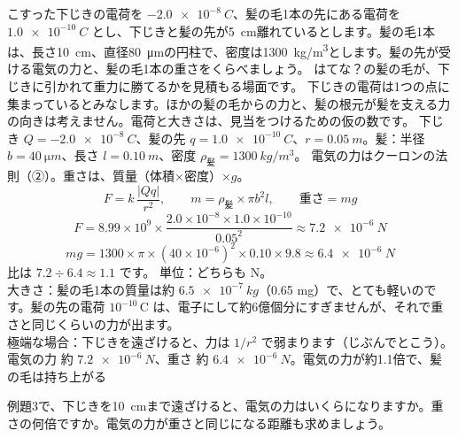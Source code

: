 \label{ph:電-1:ex3}
\begin{phreidai}
こすった下じきの電荷を $\qty{-2.0e-8}{C}$、髪の毛1本の先にある電荷を $\qty{+1.0e-10}{C}$ とし、下じきと髪の先が\qty{5}{cm}離れているとします。髪の毛1本は、長さ\qty{10}{cm}、直径\qty{80}{\micro m}の円柱で、密度は\qty{1300}{kg/m^3}とします。髪の先が受ける電気の力と、髪の毛1本の重さをくらべましょう。
\phbamen
はてな？の髪の毛が、下じきに引かれて重力に勝てるかを見積もる場面です。
\phmushi
下じきの電荷は1つの点に集まっているとみなします。ほかの髪の毛からの力と、髪の根元が髪を支える力の向きは考えません。電荷と大きさは、見当をつけるための仮の数です。
\phzu
下じき $Q=\qty{-2.0e-8}{C}$、髪の先 $q=\qty{1.0e-10}{C}$、$r=\qty{0.05}{m}$。髪：半径 $b=\qty{40}{\micro m}$、長さ $l=\qty{0.10}{m}$、密度 $\rho_{\text{髪}}=\qty{1300}{kg/m^3}$。
\phriyu
電気の力はクーロンの法則（②）。重さは、質量（体積×密度）×$g$。
\phtateru
\[F=k\,\frac{|Qq|}{r^2},\qquad m=\rho_{\text{髪}}\times\pi b^2l,\qquad\text{重さ}=mg\]
\phtoku
\[F=8.99\times10^9\times\frac{2.0\times10^{-8}\times1.0\times10^{-10}}{0.05^2}\approx\qty{7.2e-6}{N}\]
\[mg=1300\times\pi\times(40\times10^{-6})^2\times0.10\times9.8\approx\qty{6.4e-6}{N}\]
比は $7.2\div6.4\approx1.1$ です。
\phtashikame
単位：どちらも N。\\
大きさ：髪の毛1本の質量は約 $\qty{6.5e-7}{kg}$（0.65 mg）で、とても軽いのです。髪の先の電荷 $10^{-10}$\,C は、電子にして約6億個分にすぎませんが、それで重さと同じくらいの力が出ます。\\
極端な場合：下じきを遠ざけると、力は $1/r^2$ で弱まります（じぶんでとこう）。
\kotae 電気の力 約 $\qty{7.2e-6}{N}$、重さ 約 $\qty{6.4e-6}{N}$。電気の力が約1.1倍で、髪の毛は持ち上がる
\end{phreidai}
\begin{jibun}
例題3で、下じきを\qty{10}{cm}まで遠ざけると、電気の力はいくらになりますか。重さの何倍ですか。電気の力が重さと同じになる距離も求めましょう。
\end{jibun}

